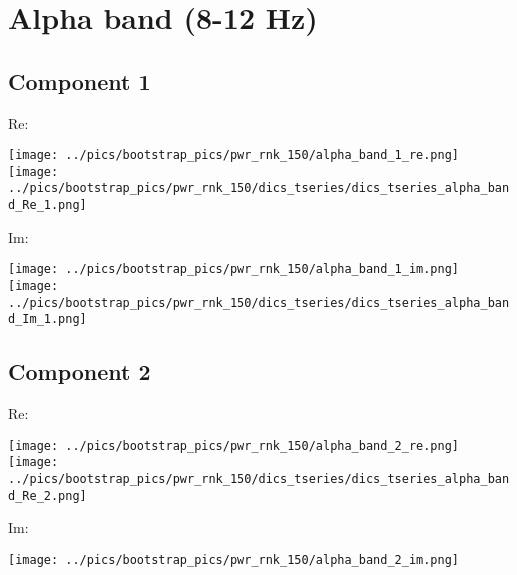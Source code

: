 \documentclass{article}
\begin{document}

\section{Alpha band (8-12 Hz)}
\subsection*{Component 1}
Re:

\hspace{2cm}
\texttt{[image: ../pics/bootstrap\_pics/pwr\_rnk\_150/alpha\_band\_1\_re.png]}
\hspace{2cm}
\texttt{[image: ../pics/bootstrap\_pics/pwr\_rnk\_150/dics\_tseries/dics\_tseries\_alpha\_band\_Re\_1.png]}

Im:

\hspace{2cm}
\texttt{[image: ../pics/bootstrap\_pics/pwr\_rnk\_150/alpha\_band\_1\_im.png]}
\hspace{2cm}
\texttt{[image: ../pics/bootstrap\_pics/pwr\_rnk\_150/dics\_tseries/dics\_tseries\_alpha\_band\_Im\_1.png]}

\subsection*{Component 2}
Re:

\hspace{2cm}
\texttt{[image: ../pics/bootstrap\_pics/pwr\_rnk\_150/alpha\_band\_2\_re.png]}
\hspace{2cm}
\texttt{[image: ../pics/bootstrap\_pics/pwr\_rnk\_150/dics\_tseries/dics\_tseries\_alpha\_band\_Re\_2.png]}

Im:

\hspace{2cm}
\texttt{[image: ../pics/bootstrap\_pics/pwr\_rnk\_150/alpha\_band\_2\_im.png]}
\end{document}
